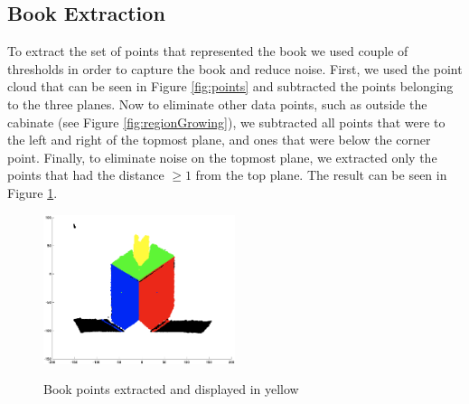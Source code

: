 \subsection{Book Extraction}
To extract the set of points that represented the book we used couple of thresholds in order to capture the book and reduce noise. First, we used the point cloud that can be seen in Figure \ref{fig:points} and subtracted the points belonging to the three planes. Now to eliminate other data points, such as outside the cabinate (see Figure \ref{fig:regionGrowing}), we subtracted all points that were to the left and right of the topmost plane, and ones that were below the corner point. Finally, to eliminate noise on the topmost plane, we extracted only the points that had the distance $\geq 1$ from the top plane. The result can be seen in Figure \ref{fig:bookPoints}.

\begin{figure}[H]
	\centering
	\includegraphics[width=0.5\textwidth]{Images/6-BookPoints(1).png}
	\label{fig:bookPoints}
	\caption{Book points extracted and displayed in yellow}
\end{figure}